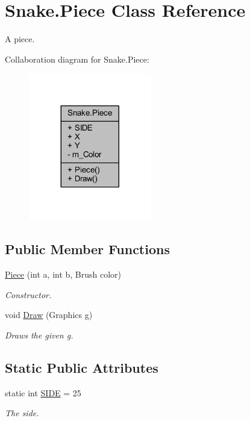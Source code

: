 \hypertarget{class_snake_1_1_piece}{}\section{Snake.\+Piece Class Reference}
\label{class_snake_1_1_piece}


A piece.  




Collaboration diagram for Snake.\+Piece\+:
\nopagebreak
\begin{figure}[H]
\begin{center}
\leavevmode
\includegraphics[width=152pt]{d1/d57/class_snake_1_1_piece__coll__graph}
\end{center}
\end{figure}
\subsection*{Public Member Functions}
\begin{DoxyCompactItemize}
\item 
\mbox{\hyperlink{class_snake_1_1_piece_a9bad54ea0c86794e056c58433b966f28}{Piece}} (int a, int b, Brush color)
\begin{DoxyCompactList}\small\item\em Constructor. \end{DoxyCompactList}\item 
void \mbox{\hyperlink{class_snake_1_1_piece_aa6bab7c3218640a9ad730155c9950116}{Draw}} (Graphics g)
\begin{DoxyCompactList}\small\item\em Draws the given g. \end{DoxyCompactList}\end{DoxyCompactItemize}
\subsection*{Static Public Attributes}
\begin{DoxyCompactItemize}
\item 
static int \mbox{\hyperlink{class_snake_1_1_piece_a0b060fe73837e293df54638df8767686}{S\+I\+DE}} = 25
\begin{DoxyCompactList}\small\item\em The side. \end{DoxyCompactList}\end{DoxyCompactItemize}
